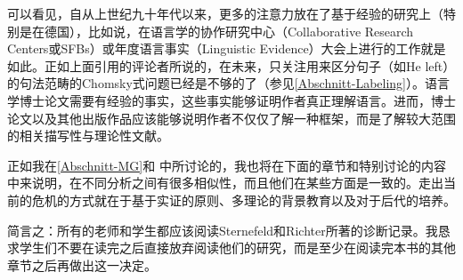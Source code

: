 {可以看见，自从上世纪九十年代以来，更多的注意力放在了基于经验的研究上（特别是在德国），比如说，在语言学的协作研究中心（Collaborative Research Centers或SFBs）或年度语言事实（Linguistic Evidence）大会上进行的工作就是如此。正如上面引用的评论者所说的，在未来，只关注用来区分句子（如He left）的句法范畴的Chomsky式问题已经是不够的了（参见\ref{Abschnitt-Labeling}）。语言学博士论文需要有经验的事实，这些事实能够证明作者真正理解语言。进而，博士论文以及其他出版作品应该能够说明作者不仅仅了解一种框架，而是了解较大范围的相关描写性与理论性文献。

正如我在\ref{Abschnitt-MG}和 中所讨论的，我也将在下面的章节和特别讨论的内容中来说明，在不同分析之间有很多相似性，而且他们在某些方面是一致的。走出当前的危机的方式就在于基于实证的原则、多理论的背景教育以及对于后代的培养。

简言之：所有的老师和学生都应该阅读Sternefeld和Richter所著的诊断记录。我恳求学生们不要在读完之后直接放弃阅读他们的研究，而是至少在阅读完本书的其他章节之后再做出这一决定。
}


